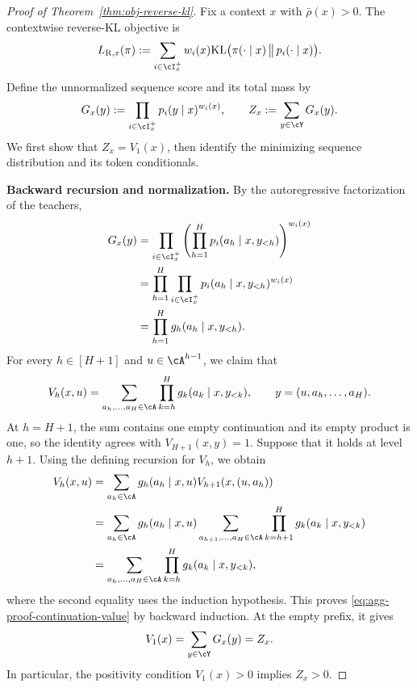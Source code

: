 \documentclass[11pt]{article}
\newcommand{\KL}{\text{KL}}
\begin{document}
\begin{proof}[Proof of Theorem~\ref{thm:obj-reverse-kl}]
Fix a context $x$ with $\bar\rho(x)>0$. The contextwise
reverse-KL objective is
\begin{align*}
    L_{\mathrm R,x}(\pi)
    :=\sum_{i\in\cI_x^+}w_i(x)
    \KL\bigl(\pi(\cdot\mid x)\,\big\|\,p_i(\cdot\mid x)\bigr).
\end{align*}
Define the unnormalized sequence score and its total mass by
\begin{align*}
    G_x(y):=\prod_{i\in\cI_x^+}p_i(y\mid x)^{w_i(x)},
    \qquad Z_x:=\sum_{y\in\cY}G_x(y).
\end{align*}
We first show that $Z_x=V_1(x)$, then identify the minimizing
sequence distribution and its token conditionals.

\textbf{Backward recursion and normalization.}
By the autoregressive factorization of the teachers,
\begin{align}
    G_x(y)
    &=\prod_{i\in\cI_x^+}
      \left(\prod_{h=1}^H p_i(a_h\mid x,y_{<h})\right)^{w_i(x)}
      \notag\\*
    &=\prod_{h=1}^H\prod_{i\in\cI_x^+}
      p_i(a_h\mid x,y_{<h})^{w_i(x)}\notag\\*
    &=\prod_{h=1}^H g_h(a_h\mid x,y_{<h}).
    \label{eq:agg-proof-reverse-factorization}
\end{align}
For every $h\in[H+1]$ and $u\in\cA^{h-1}$, we claim that
\begin{align}
    V_h(x,u)
    =\sum_{a_h,\ldots,a_H\in\cA}
      \prod_{k=h}^H g_k(a_k\mid x,y_{<k}),
    \qquad y=(u,a_h,\ldots,a_H).
    \label{eq:agg-proof-continuation-value}
\end{align}
At $h=H+1$, the sum contains one empty continuation and its
empty product is one, so the identity agrees with
$V_{H+1}(x,y)=1$. Suppose that it holds at level $h+1$.
Using the defining recursion for $V_h$, we obtain
\begin{align*}
    V_h(x,u)
    &=\sum_{a_h\in\cA}g_h(a_h\mid x,u)
      V_{h+1}(x,(u,a_h))\\*
    &=\sum_{a_h\in\cA}g_h(a_h\mid x,u)
      \sum_{a_{h+1},\ldots,a_H\in\cA}
      \prod_{k=h+1}^H g_k(a_k\mid x,y_{<k})\\*
    &=\sum_{a_h,\ldots,a_H\in\cA}
      \prod_{k=h}^H g_k(a_k\mid x,y_{<k}),
\end{align*}
where the second equality uses the induction hypothesis.
This proves \eqref{eq:agg-proof-continuation-value} by backward
induction. At the empty prefix, it gives
\begin{align}
    V_1(x)=\sum_{y\in\cY}G_x(y)=Z_x.
    \label{eq:agg-proof-reverse-normalizer}
\end{align}
In particular, the positivity condition $V_1(x)>0$ implies
$Z_x>0$.


\end{proof}
\end{document}
